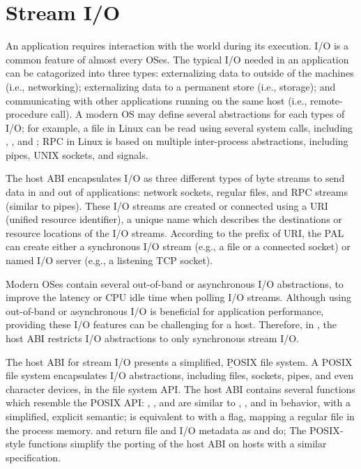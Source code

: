 \section{Stream I/O}
\label{sec:abi:streams}


An application requires interaction with the world during its execution.
I/O is a common feature of almost every OSes.
The typical I/O needed in an application
can be catagorized into three types:
externalizing data to outside of the machines (i.e., networking);
externalizing data to a permanent store (i.e., storage);
and communicating with other applications running on the same host (i.e., remote-procedure call).
A modern OS may define several abstractions
for each types of I/O; for example, a file in Linux can be read using several system calls,
including , , and ;
RPC in Linux is based on multiple inter-process abstractions,
including pipes, UNIX sockets, and signals.




The host ABI
encapsulates I/O as three different types of byte streams
to send data in and out of applications:
network sockets, regular files, and RPC streams (similar to pipes).
These I/O streams
are created or connected using a URI (unified resource identifier),
a unique name which describes the destinations or resource locations of the I/O streams.
According to the prefix of URI,
the PAL can create either a synchronous I/O stream (e.g., a file or a connected socket)
or named I/O server (e.g., a listening TCP socket).


Modern OSes contain several out-of-band or asynchronous I/O abstractions, to improve the latency or CPU idle time
when polling I/O streams.
Although using out-of-band or asynchronous I/O is beneficial for application performance,
providing these I/O features can be challenging for a host.
Therefore, in \graphene{}, the host ABI restricts I/O abstractions to only synchronous stream I/O.



The host ABI for stream I/O presents a simplified, {\b POSIX file system}.
A POSIX file system
encapsulates I/O abstractions,
including files, sockets, pipes, and even character devices,
in the file system API.
The host ABI contains several functions
which resemble the POSIX API:
, , and 
are similar to , , and  in behavior, with a simplified, explicit semantic;
 is equivalent to  with a  flag, mapping a regular file in the process memory. %
 and 
return file and I/O metadata
as  and  do;
The POSIX-style functions simplify the porting of the host ABI
on hosts with a similar specification.






